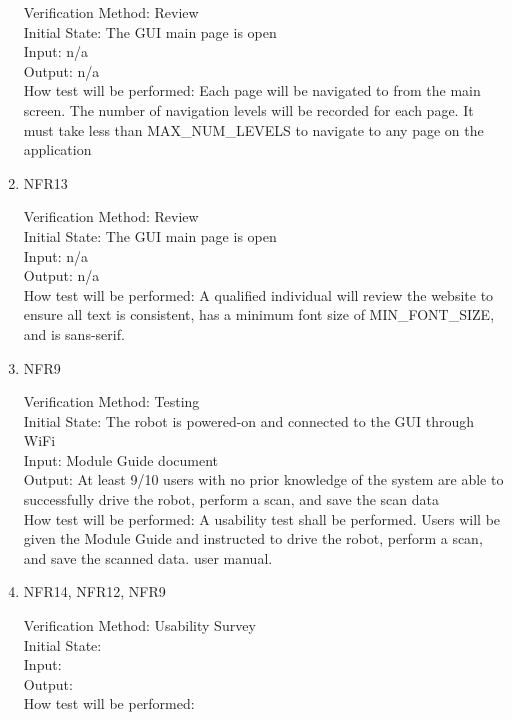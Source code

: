 \documentclass[12pt, titlepage]{article}
\begin{document}
\begin{enumerate}
Verification Method: Review\\					
Initial State: The GUI main page is open\\			
Input: n/a\\
Output: n/a\\
How test will be performed: Each page will be navigated to from the main screen. The number of navigation levels will be recorded for each page. It must take less than MAX\_NUM\_LEVELS to navigate to any page on the application\\

\item{NFR13\\}

Verification Method: Review\\					
Initial State: The GUI main page is open\\			
Input: n/a\\
Output: n/a\\
How test will be performed: A qualified individual will review the website to ensure all text is consistent, has a minimum font size of MIN\_FONT\_SIZE, and is sans-serif. \\

\item{NFR9\\}

Verification Method: Testing\\					
Initial State: The robot is powered-on and connected to the GUI through WiFi\\			
Input: Module Guide document\\
Output: At least 9/10 users with no prior knowledge of the system are able to successfully drive the robot, perform a scan, and save the scan data\\
How test will be performed: A usability test shall be performed. Users will be given the Module Guide and instructed to drive the robot, perform a scan, and save the scanned data.
user manual.\\ 

\item{NFR14, NFR12, NFR9\\}

Verification Method: Usability Survey\\					
Initial State: 		\\
Input: \\
Output: \\
How test will be performed:\\


\end{enumerate}
\end{document}
